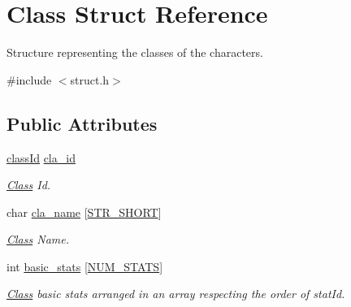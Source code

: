 \hypertarget{struct_class}{}\section{Class Struct Reference}
\label{struct_class}


Structure representing the classes of the characters.  




{\ttfamily \#include $<$struct.\+h$>$}

\subsection*{Public Attributes}
\begin{DoxyCompactItemize}
\item 
\mbox{\label{struct_class_ad62c4d6efa2b29a2154b24d0fbd1b68e}} 
\hyperlink{substruct_8h_ac838c216df52582085ca9e1eb6d19d07}{class\+Id} \hyperlink{struct_class_ad62c4d6efa2b29a2154b24d0fbd1b68e}{cla\+\_\+id}
\begin{DoxyCompactList}\small\item\em \hyperlink{struct_class}{Class} Id. \end{DoxyCompactList}\item 
\mbox{\label{struct_class_aa4e0963690a36008c37129bdb527a7dd}} 
char \hyperlink{struct_class_aa4e0963690a36008c37129bdb527a7dd}{cla\+\_\+name} \mbox{[}\hyperlink{common_8h_adea6e0778ed738e315a134cb865c141f}{S\+T\+R\+\_\+\+S\+H\+O\+RT}\mbox{]}
\begin{DoxyCompactList}\small\item\em \hyperlink{struct_class}{Class} Name. \end{DoxyCompactList}\item 
\mbox{\label{struct_class_af90c04d045c1ffd1973677ba04328af9}} 
int \hyperlink{struct_class_af90c04d045c1ffd1973677ba04328af9}{basic\+\_\+stats} \mbox{[}\hyperlink{substruct_8h_a8dd66bb045cef1046c504653db25ccde}{N\+U\+M\+\_\+\+S\+T\+A\+TS}\mbox{]}
\begin{DoxyCompactList}\small\item\em \hyperlink{struct_class}{Class}\textquotesingle{} basic stats arranged in an array respecting the order of stat\+Id. \end{DoxyCompactList}\item 
\mbox{\label{struct_class_a24d1d370cb59a4102cc798d75c7973f2}} 

\end{DoxyCompactItemize}
